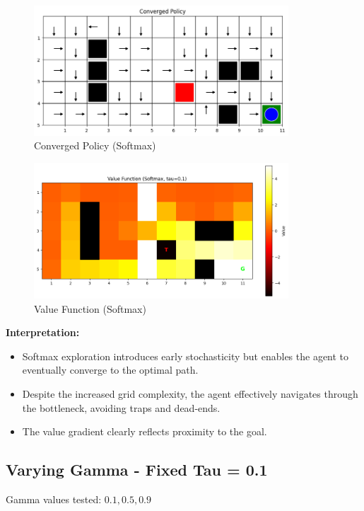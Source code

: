 \documentclass[12pt]{article}
\begin{document}
\begin{figure}[H]
  \centering
  \includegraphics[width=0.85\textwidth]{images/part2_q1_policy.png}
  \caption{Converged Policy (Softmax)}
\end{figure}
\begin{figure}[H]
  \centering
  \includegraphics[width=0.85\textwidth]{images/part2_q1_value.png}
  \caption{Value Function (Softmax)}
\end{figure}

\textbf{Interpretation:}
\begin{itemize}
  \item Softmax exploration introduces early stochasticity but enables the agent to eventually converge to the optimal path.
  \item Despite the increased grid complexity, the agent effectively navigates through the bottleneck, avoiding traps and dead-ends.
  \item The value gradient clearly reflects proximity to the goal.
\end{itemize}

\newpage
\subsection{Varying Gamma - Fixed Tau = 0.1}
Gamma values tested: \(0.1, 0.5, 0.9\)
\end{document}

